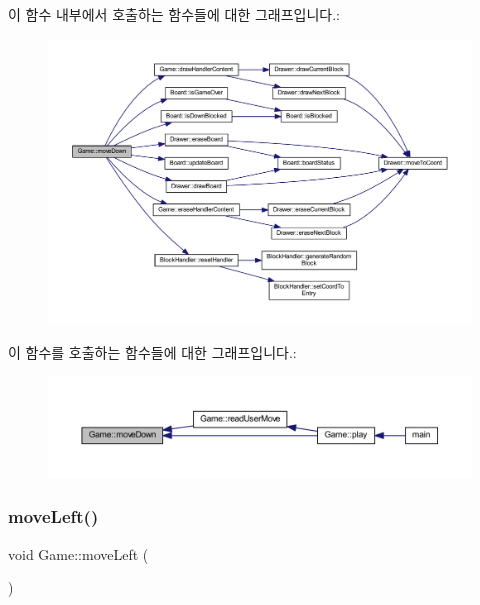 이 함수 내부에서 호출하는 함수들에 대한 그래프입니다.\+:
\nopagebreak
\begin{figure}[H]
\begin{center}
\leavevmode
\includegraphics[width=350pt]{class_game_af379862400da53dd8f296f0990c0953f_cgraph}
\end{center}
\end{figure}
이 함수를 호출하는 함수들에 대한 그래프입니다.\+:
\nopagebreak
\begin{figure}[H]
\begin{center}
\leavevmode
\includegraphics[width=350pt]{class_game_af379862400da53dd8f296f0990c0953f_icgraph}
\end{center}
\end{figure}
\mbox{\label{class_game_a3bd586b9c1bcd71f78bc2c2f7e2fe9e7}} 
\subsubsection{\texorpdfstring{move\+Left()}{moveLeft()}}
{\footnotesize\ttfamily void Game\+::move\+Left (\begin{DoxyParamCaption}{ }\end{DoxyParamCaption})\hspace{0.3cm}{\ttfamily [inline]}}



